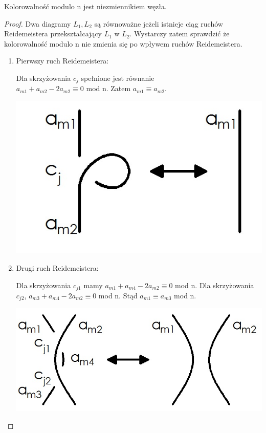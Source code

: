 \begin{twierdzenie} Kolorowalność modulo n jest niezmiennikiem węzła.
\end{twierdzenie}
\begin{proof}
Dwa diagramy $L_{1}, L_{2}$ są równoważne jeżeli istnieje ciąg ruchów Reidemeistera przekształcający $L_{1}$ w $L_{2}$. Wystarczy zatem sprawdzić że kolorowalność modulo n nie zmienia się po wpływem ruchów Reidemeistera.

\begin{enumerate} \item Pierwszy ruch Reidemeistera: 

	\begin{minipage}{0.5\textwidth}
	Dla skrzyżowania $c_{j}$ spełnione jest równanie \\ $a_{m1}+a_{m2}-2a_{m2} \equiv 0$ mod n. Zatem $a_{m1} \equiv a_{m2}$.
	\end{minipage}
	\begin{minipage}{0.5\textwidth}
		\begin{center}
			\includegraphics[scale=0.3]{2/Obrazy/R1}
		\end{center}
	\end{minipage}
\item Drugi ruch Reidemeistera: 

	\begin{minipage}{0.5\textwidth}
	Dla skrzyżowania $c_{j1}$ mamy $a_{m1}+a_{m4}-2a_{m2} \equiv 0$ mod n. Dla skrzyżowania $c_{j2}$, $a_{m3}+a_{m4}-2a_{m2} \equiv 0$ mod n. Stąd $a_{m1} \equiv a_{m3} $ mod n.
	\end{minipage}
	\begin{minipage}{0.5\textwidth}
		\begin{center}
			\includegraphics[scale=0.3]{2/Obrazy/R2}
		\end{center}
	\end{minipage}
	

\end{enumerate}
\end{proof}

